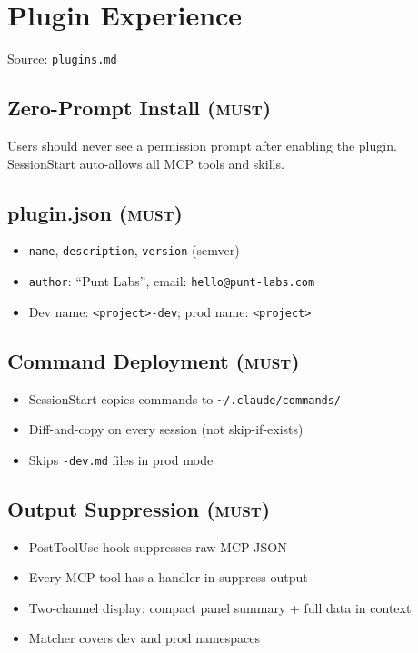\documentclass[a4paper,10pt]{article}
\newcommand{\must}{\textsc{must}}
\begin{document}
\section{Plugin Experience}
\label{sec:plugins}
Source: \texttt{plugins.md}

\subsection{Zero-Prompt Install (\must)}
Users should never see a permission prompt after enabling the plugin.
SessionStart auto-allows all MCP tools and skills.

\subsection{plugin.json (\must)}
\begin{itemize}
  \item \texttt{name}, \texttt{description}, \texttt{version} (semver)
  \item \texttt{author}: ``Punt Labs'', email: \texttt{hello@punt-labs.com}
  \item Dev name: \texttt{<project>-dev}; prod name: \texttt{<project>}
\end{itemize}

\subsection{Command Deployment (\must)}
\begin{itemize}
  \item SessionStart copies commands to \texttt{\textasciitilde/.claude/commands/}
  \item Diff-and-copy on every session (not skip-if-exists)
  \item Skips \texttt{-dev.md} files in prod mode
\end{itemize}

\subsection{Output Suppression (\must)}
\begin{itemize}
  \item PostToolUse hook suppresses raw MCP JSON
  \item Every MCP tool has a handler in suppress-output
  \item Two-channel display: compact panel summary + full data in context
  \item Matcher covers dev and prod namespaces
\end{itemize}
\end{document}
